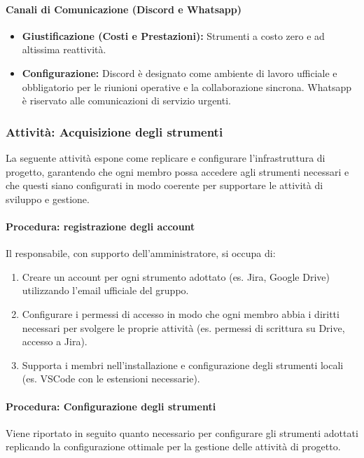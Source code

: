 \documentclass[a4paper,12pt]{article}
\begin{document}
\paragraph{Canali di Comunicazione (Discord e Whatsapp)}
\begin{itemize}
    \item \textbf{Giustificazione (Costi e Prestazioni):} Strumenti a costo zero e ad altissima reattività.
    \item \textbf{Configurazione:} Discord è designato come ambiente di lavoro ufficiale e obbligatorio per le riunioni operative e la collaborazione sincrona. Whatsapp è riservato alle comunicazioni di servizio urgenti.
\end{itemize}

\subsubsection{Attività: Acquisizione degli strumenti}\label{creazioneInfrastruttura}
La seguente attività espone come replicare e configurare l'infrastruttura di progetto, garantendo che ogni membro possa accedere agli strumenti necessari e che questi siano configurati in modo coerente per supportare le attività di sviluppo e gestione.
\paragraph{Procedura: registrazione degli account}
Il responsabile, con supporto dell'amministratore, si occupa di:
\begin{enumerate}
    \item Creare un account per ogni strumento adottato (es. Jira, Google Drive) utilizzando l'email ufficiale del gruppo.
    \item Configurare i permessi di accesso in modo che ogni membro abbia i diritti necessari per svolgere le proprie attività (es. permessi di scrittura su Drive, accesso a Jira).
    \item Supporta i membri nell'installazione e configurazione degli strumenti locali (es. VSCode con le estensioni necessarie).
\end{enumerate}

\paragraph{Procedura: Configurazione degli strumenti}
Viene riportato in seguito quanto necessario per configurare gli strumenti adottati replicando la configurazione ottimale per la gestione delle attività di progetto.
\end{document}
